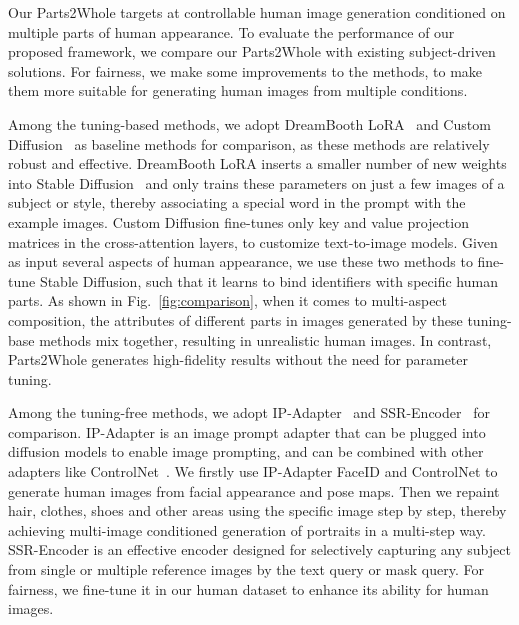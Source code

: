Our Parts2Whole targets at controllable human image generation conditioned on multiple parts of human appearance. To evaluate the performance of our proposed framework, we compare our Parts2Whole with existing subject-driven solutions. For fairness, we make some improvements to the methods, to make them more suitable for generating human images from multiple conditions.

Among the tuning-based methods, we adopt DreamBooth LoRA~\cite{ruiz2023dreambooth,hu2021lora} and Custom Diffusion~\cite{kumari2023customdiffusion} as baseline methods for comparison, as these methods are relatively robust and effective. DreamBooth LoRA inserts a smaller number of new weights into Stable Diffusion~\cite{rombach2022ldm} and only trains these parameters on just a few images of a subject or style, thereby associating a special word in the prompt with the example images. Custom Diffusion fine-tunes only key and value projection matrices in the cross-attention layers, to customize text-to-image models. Given as input several aspects of human appearance, we use these two methods to fine-tune Stable Diffusion, such that it learns to bind identifiers with specific human parts. As shown in Fig.~\ref{fig:comparison}, when it comes to multi-aspect composition, the attributes of different parts in images generated by these tuning-base methods mix together, resulting in unrealistic human images. In contrast, Parts2Whole generates high-fidelity results without the need for parameter tuning.

Among the tuning-free methods, we adopt IP-Adapter~\cite{ye2023ipadapter} and SSR-Encoder~\cite{zhang2024ssrencoder} for comparison. IP-Adapter is an image prompt adapter that can be plugged into diffusion models to enable image prompting, and can be combined with other adapters like ControlNet~\cite{zhang2023controlnet}. We firstly use IP-Adapter FaceID and ControlNet to generate human images from facial appearance and pose maps. Then we repaint hair, clothes, shoes and other areas using the specific image step by step, thereby achieving multi-image conditioned generation of portraits in a multi-step way. SSR-Encoder is an effective encoder designed for selectively capturing any subject from single or multiple reference images by the text query or mask query. For fairness, we fine-tune it in our human dataset to enhance its ability for human images.

